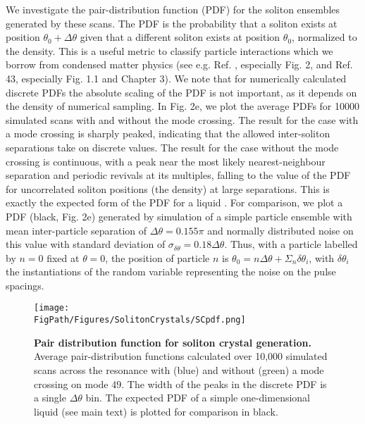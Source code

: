 We investigate the pair-distribution function (PDF) for the soliton ensembles generated by these scans. The PDF is the probability that a soliton exists at position $\theta_0+\Delta\theta$ given that a different soliton exists at position $\theta_0$, normalized to the density. This is a useful metric to classify particle interactions which we borrow from condensed matter physics (see e.g. Ref. \cite{42}, especially Fig. 2, and Ref. 43, especially Fig. 1.1 and Chapter 3). We note that for numerically calculated discrete PDFs the absolute scaling of the PDF is not important, as it depends on the density of numerical sampling. In Fig. 2e, we plot the average PDFs for 10000 simulated scans with and without the mode crossing. The result for the case with a mode crossing is sharply peaked, indicating that the allowed inter-soliton separations take on discrete values. The result for the case without the mode crossing is continuous, with a peak near the most likely nearest-neighbour separation and periodic revivals at its multiples, falling to the value of the PDF for uncorrelated soliton positions (the density) at large separations. This is exactly the expected form of the PDF for a liquid \cite{42,43}. For comparison, we plot a PDF (black, Fig. 2e) generated by simulation of a simple particle ensemble with mean inter-particle separation of $\Delta\theta=0.155\pi$ and normally distributed noise on this value with standard deviation of $\sigma_{\delta\theta}=0.18\Delta\theta$. Thus, with a particle labelled by $n = 0$ fixed at $\theta = 0$, the position of particle $n$ is $\theta_0 = n\Delta\theta + \Sigma_n\delta\theta_i$, with $\delta\theta_i$ the instantiations of the random variable representing the noise on the pulse spacings. 

\begin{figure}[htpb]
	\begin{center}
		\texttt{[image: \\FigPath/Figures/SolitonCrystals/SCpdf.png]}
	\end{center}
	\caption[Pair distribution function for soliton crystal generation]{\textbf{Pair distribution function for soliton crystal generation.} Average pair-distribution functions calculated over 10,000 simulated scans across the resonance with (blue) and without (green) a mode crossing on mode 49. The width of the peaks in the discrete PDF is a single $\Delta\theta$ bin. The expected PDF of a simple one-dimensional liquid (see main text) is plotted for comparison in black.}
	\label{fig:SCpdf}
\end{figure} 



